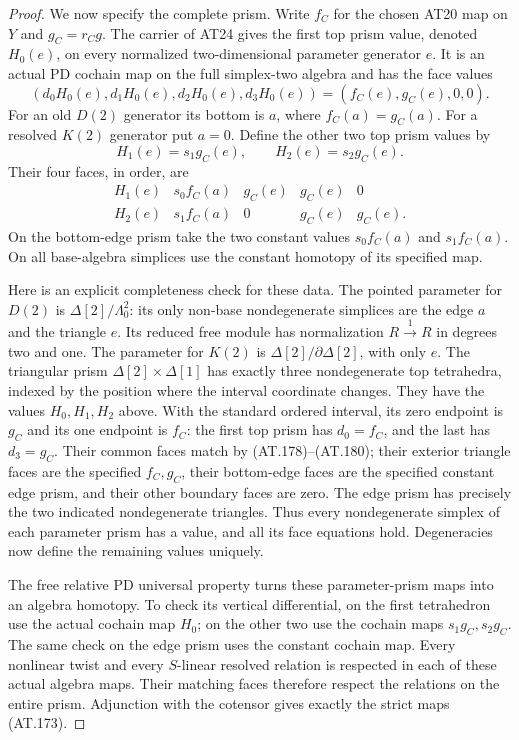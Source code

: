 \begin{proof}
We now specify the complete prism.
Write $f_C$ for the chosen AT20 map on $Y$ and
$g_C=r_Cg$.
The carrier of AT24 gives the first top prism
value, denoted $H_0(e)$, on every normalized
two-dimensional parameter generator $e$.
It is an actual PD cochain map on the full
simplex-two algebra and has the face values
\[
        (d_0H_0(e),d_1H_0(e),d_2H_0(e),d_3H_0(e))
                         =(f_C(e),g_C(e),0,0).
 \tag{AT.178}
\]
For an old $D(2)$ generator its bottom is $a$,
where $f_C(a)=g_C(a)$.
For a resolved $K(2)$ generator put $a=0$.
Define the other two top prism values by
\[
                  H_1(e)=s_1g_C(e),\qquad
                  H_2(e)=s_2g_C(e).
 \tag{AT.179}
\]
Their four faces, in order, are
\[
 \begin{array}{c|cccc}
 H_1(e)&s_0f_C(a)&g_C(e)&g_C(e)&0\\
 H_2(e)&s_1f_C(a)&0&g_C(e)&g_C(e).
 \end{array}
 \tag{AT.180}
\]
On the bottom-edge prism take the two constant
values $s_0f_C(a)$ and $s_1f_C(a)$.
On all base-algebra simplices use the constant
homotopy of its specified map.

Here is an explicit completeness check for these
data. The pointed parameter for $D(2)$ is
$\Delta[2]/\Lambda^2_0$: its only non-base
nondegenerate simplices are the edge $a$ and
the triangle $e$. Its reduced free module has
normalization $R\xrightarrow{1}R$ in degrees
two and one. The parameter for $K(2)$ is
$\Delta[2]/\partial\Delta[2]$, with only $e$.
The triangular prism $\Delta[2]\times\Delta[1]$
has exactly three nondegenerate top tetrahedra,
indexed by the position where the interval
coordinate changes. They have the values
$H_0,H_1,H_2$ above.
With the standard ordered interval, its zero
endpoint is $g_C$ and its one endpoint is $f_C$:
the first top prism has $d_0=f_C$, and the last
has $d_3=g_C$.
Their common faces match by
(AT.178)--(AT.180); their exterior triangle
faces are the specified $f_C,g_C$, their
bottom-edge faces are the specified constant
edge prism, and their other boundary faces
are zero. The edge prism has precisely the
two indicated nondegenerate triangles.
Thus every nondegenerate simplex of each
parameter prism has a value, and all its
face equations hold. Degeneracies now define
the remaining values uniquely.

The free relative PD universal property turns
these parameter-prism maps into an algebra
homotopy. To check its vertical differential,
on the first tetrahedron use the actual
cochain map $H_0$; on the other two use the
cochain maps $s_1g_C,s_2g_C$.
The same check on the edge prism uses the
constant cochain map.
Every nonlinear twist and every $S$-linear
resolved relation is respected in each of
these actual algebra maps.
Their matching faces therefore respect the
relations on the entire prism.
Adjunction with the cotensor gives exactly
the strict maps (AT.173).


\end{proof}
